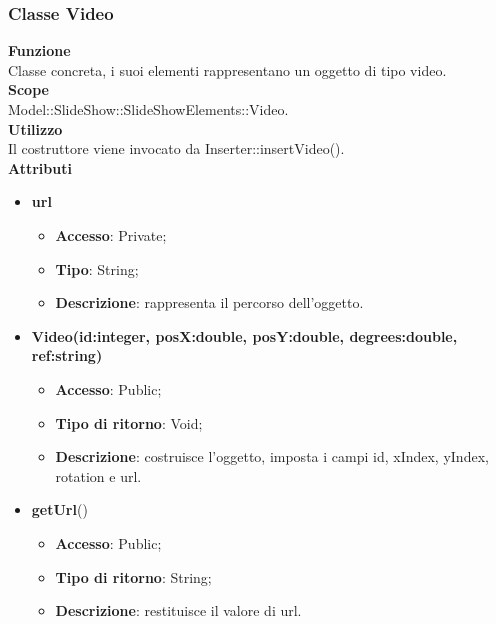 {	\subsubsection{Classe Video}{
		\label{Video}
		\textbf{Funzione}\\
			\indent Classe concreta, i suoi elementi rappresentano un oggetto di tipo video.\\
	   	\textbf{Scope}\\
			\indent Model::SlideShow::SlideShowElements::Video.\\
		\textbf{Utilizzo}\\
			\indent Il costruttore viene invocato da Inserter::insertVideo().\\
		\textbf{Attributi}
		\begin{itemize}
			\item \textbf{url}
			\begin{itemize}
				\item \textbf{Accesso}: Private;
				\item \textbf{Tipo}: String;
				\item \textbf{Descrizione}: rappresenta il percorso dell’oggetto.
			\end{itemize}
		\end{itemize}
		\begin{itemize}
			\item \textbf{Video(id:integer, posX:double, posY:double, degrees:double, ref:string)}
			\begin{itemize}
				\item \textbf{Accesso}: Public;
				\item \textbf{Tipo di ritorno}: Void;
				\item \textbf{Descrizione}: costruisce l’oggetto, imposta i campi id, xIndex, yIndex, rotation e url.
			\end{itemize}
			\item \textbf{getUrl}()
			\begin{itemize}
				\item \textbf{Accesso}: Public;
				\item \textbf{Tipo di ritorno}: String;
				\item \textbf{Descrizione}: restituisce il valore di url.
			\end{itemize}
		\end{itemize}
		}

}
